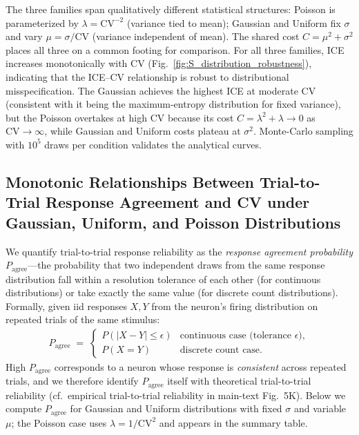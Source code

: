 \documentclass[11pt]{article}
\theoremstyle{remark}
\theoremstyle{definition}
\begin{document}
The three families span qualitatively different statistical structures: Poisson is parameterized by $\lambda = \mathrm{CV}^{-2}$ (variance tied to mean); Gaussian and Uniform fix $\sigma$ and vary $\mu = \sigma/\mathrm{CV}$ (variance independent of mean).  The shared cost $C = \mu^2 + \sigma^2$ places all three on a common footing for comparison.  For all three families, ICE increases monotonically with CV (Fig.~\ref{fig:S_distribution_robustness}), indicating that the ICE--CV relationship is robust to distributional misspecification.  The Gaussian achieves the highest ICE at moderate CV (consistent with it being the maximum-entropy distribution for fixed variance), but the Poisson overtakes at high CV because its cost $C = \lambda^2 + \lambda \to 0$ as $\mathrm{CV}\to\infty$, while Gaussian and Uniform costs plateau at $\sigma^2$.  Monte-Carlo sampling with $10^5$ draws per condition validates the analytical curves.


\subsection{Monotonic Relationships Between Trial-to-Trial Response Agreement and CV under Gaussian, Uniform, and Poisson Distributions}
\label{sec:trial-agreement}

We quantify trial-to-trial response reliability as the \emph{response agreement probability} $P_{\mathrm{agree}}$---the probability that two independent draws from the same response distribution fall within a resolution tolerance of each other (for continuous distributions) or take exactly the same value (for discrete count distributions).  Formally, given iid responses $X, Y$ from the neuron's firing distribution on repeated trials of the same stimulus:
\begin{align}
P_{\mathrm{agree}}
\;=\;
\begin{cases}
P(|X - Y| \le \epsilon) & \text{continuous case (tolerance } \epsilon\text{)},\\[2pt]
P(X = Y)                & \text{discrete count case}.
\end{cases}
\end{align}
High $P_{\mathrm{agree}}$ corresponds to a neuron whose response is \emph{consistent} across repeated trials, and we therefore identify $P_{\mathrm{agree}}$ itself with theoretical trial-to-trial reliability (cf.\ empirical trial-to-trial reliability in main-text Fig.~5K).  Below we compute $P_{\mathrm{agree}}$ for Gaussian and Uniform distributions with fixed $\sigma$ and variable $\mu$; the Poisson case uses $\lambda = 1/\mathrm{CV}^2$ and appears in the summary table.
\end{document}
